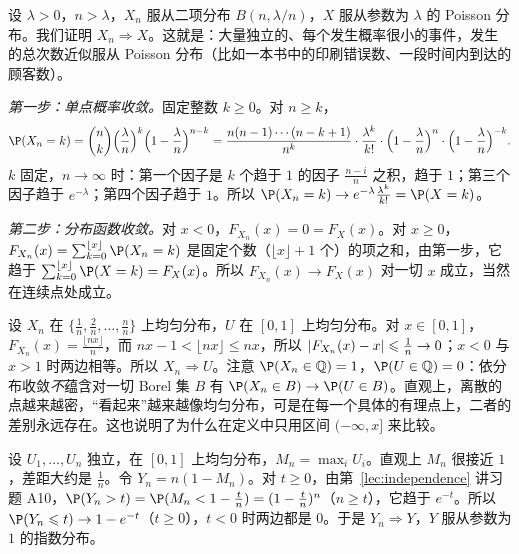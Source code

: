 \begin{example}\label{ex:convergence:binomial-poisson}
设 $\lambda>0$，$n>\lambda$，$X_n$ 服从二项分布 $B(n,\lambda/n)$，$X$ 服从参数为 $\lambda$ 的 Poisson 分布。我们证明 $X_n\Rightarrow X$。这就是：大量独立的、每个发生概率很小的事件，发生的总次数近似服从 Poisson 分布（比如一本书中的印刷错误数、一段时间内到达的顾客数）。

\emph{第一步：单点概率收敛。}固定整数 $k\geqslant0$。对 $n\geqslant k$，
\[
\P(X_n=k)=\binom nk\Bigl(\frac\lambda n\Bigr)^k\Bigl(1-\frac\lambda n\Bigr)^{n-k}=\frac{n(n-1)\cdots(n-k+1)}{n^k}\cdot\frac{\lambda^k}{k!}\cdot\Bigl(1-\frac\lambda n\Bigr)^n\cdot\Bigl(1-\frac\lambda n\Bigr)^{-k}.
\]
$k$ 固定，$n\to\infty$ 时：第一个因子是 $k$ 个趋于 $1$ 的因子 $\frac{n-i}n$ 之积，趋于 $1$；第三个因子趋于 $e^{-\lambda}$；第四个因子趋于 $1$。所以 $\P(X_n=k)\to e^{-\lambda}\frac{\lambda^k}{k!}=\P(X=k)$。

\emph{第二步：分布函数收敛。}对 $x<0$，$F_{X_n}(x)=0=F_X(x)$。对 $x\geqslant0$，$F_{X_n}(x)=\sum_{k=0}^{\lfloor x\rfloor}\P(X_n=k)$ 是固定个数（$\lfloor x\rfloor+1$ 个）的项之和，由第一步，它趋于 $\sum_{k=0}^{\lfloor x\rfloor}\P(X=k)=F_X(x)$。所以 $F_{X_n}(x)\to F_X(x)$ 对一切 $x$ 成立，当然在连续点处成立。
\end{example}

\begin{example}[离散分布逼近连续分布]\label{ex:convergence:discrete-uniform}
设 $X_n$ 在 $\{\frac1n,\frac2n,\dots,\frac nn\}$ 上均匀分布，$U$ 在 $[0,1]$ 上均匀分布。对 $x\in[0,1]$，$F_{X_n}(x)=\frac{\lfloor nx\rfloor}n$，而 $nx-1<\lfloor nx\rfloor\leqslant nx$，所以 $\lvert F_{X_n}(x)-x\rvert\leqslant\frac1n\to0$；$x<0$ 与 $x>1$ 时两边相等。所以 $X_n\Rightarrow U$。注意 $\P(X_n\in\Q)=1$，$\P(U\in\Q)=0$：依分布收敛\emph{不}蕴含对一切 Borel 集 $B$ 有 $\P(X_n\in B)\to \P(U\in B)$。直观上，离散的点越来越密，“看起来”越来越像均匀分布，可是在每一个具体的有理点上，二者的差别永远存在。这也说明了为什么在定义中只用区间 $(-\infty,x]$ 来比较。
\end{example}

\begin{example}[最大值的极限分布]\label{ex:convergence:max-uniform}
设 $U_1,\dots,U_n$ 独立，在 $[0,1]$ 上均匀分布，$M_n=\max_iU_i$。直观上 $M_n$ 很接近 $1$，差距大约是 $\frac1n$。令 $Y_n=n(1-M_n)$。对 $t\geqslant0$，由第~\ref{lec:independence} 讲习题 A10，$\P(Y_n>t)=\P(M_n<1-\frac tn)=(1-\frac tn)^n$（$n\geqslant t$），它趋于 $e^{-t}$。所以 $\P(Y_n\leqslant t)\to1-e^{-t}$（$t\geqslant0$），$t<0$ 时两边都是 $0$。于是 $Y_n\Rightarrow Y$，$Y$ 服从参数为 $1$ 的指数分布。
\end{example}

